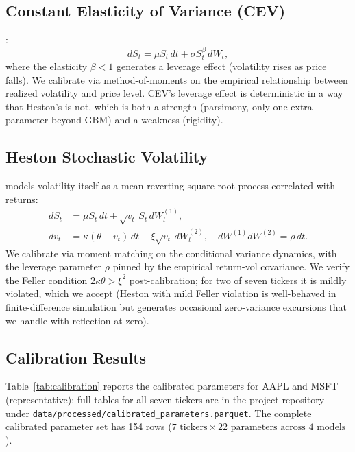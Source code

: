 \documentclass[11pt,letterpaper]{article}
\begin{document}
\subsection{Constant Elasticity of Variance (CEV)}
\citet{cox1996constant}:
\begin{equation}
dS_t = \mu S_t\, dt + \sigma S_t^{\beta}\, dW_t,
\end{equation}
where the elasticity $\beta < 1$ generates a leverage effect (volatility rises as price falls). We calibrate via method-of-moments on the empirical relationship between realized volatility and price level. CEV's leverage effect is deterministic in a way that Heston's is not, which is both a strength (parsimony, only one extra parameter beyond GBM) and a weakness (rigidity).

\subsection{Heston Stochastic Volatility}
\citet{heston1993closed} models volatility itself as a mean-reverting square-root process correlated with returns:
\begin{align}
dS_t &= \mu S_t\, dt + \sqrt{v_t}\, S_t\, dW_t^{(1)}, \\
dv_t &= \kappa(\theta - v_t)\, dt + \xi \sqrt{v_t}\, dW_t^{(2)}, \quad dW^{(1)} dW^{(2)} = \rho\, dt.
\end{align}
We calibrate via moment matching on the conditional variance dynamics, with the leverage parameter $\rho$ pinned by the empirical return-vol covariance. We verify the Feller condition $2\kappa\theta > \xi^2$ post-calibration; for two of seven tickers it is mildly violated, which we accept (Heston with mild Feller violation is well-behaved in finite-difference simulation but generates occasional zero-variance excursions that we handle with reflection at zero).

\subsection{Calibration Results}

Table~\ref{tab:calibration} reports the calibrated parameters for AAPL and MSFT (representative); full tables for all seven tickers are in the project repository under \texttt{data/processed/calibrated\_parameters.parquet}. The complete calibrated parameter set has 154 rows ($7 \text{ tickers} \times 22 \text{ parameters across 4 models}$).
\end{document}
